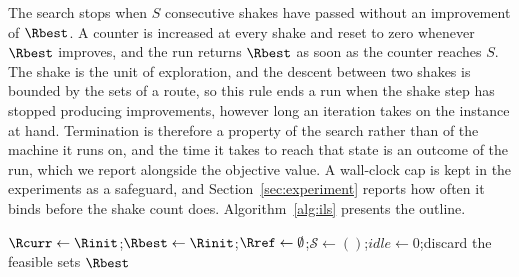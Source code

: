 The search stops when $S$ consecutive shakes have passed without an improvement of $\Rbest$. A counter is increased at every shake and reset to zero whenever $\Rbest$ improves, and the run returns $\Rbest$ as soon as the counter reaches $S$. The shake is the unit of exploration, and the descent between two shakes is bounded by the sets of a route, so this rule ends a run when the shake step has stopped producing improvements, however long an iteration takes on the instance at hand. Termination is therefore a property of the search rather than of the machine it runs on, and the time it takes to reach that state is an outcome of the run, which we report alongside the objective value. A wall-clock cap is kept in the experiments as a safeguard, and Section~\ref{sec:experiment} reports how often it binds before the shake count does. Algorithm~\ref{alg:ils} presents the outline.

\begin{algorithm}[!htbp]
\SetAlgoVlined
\LinesNumbered
\caption{Iterated local search}\label{alg:ils}
\BlankLine
$\Rcurr \leftarrow \Rinit$;\quad $\Rbest \gets \Rinit$;\quad $\Rref \gets \emptyset$;\quad $\mathcal{S} \gets ()$;\quad $\mathit{idle} \gets 0$;\quad discard the feasible sets\;
\Return $\Rbest$
\end{algorithm}

